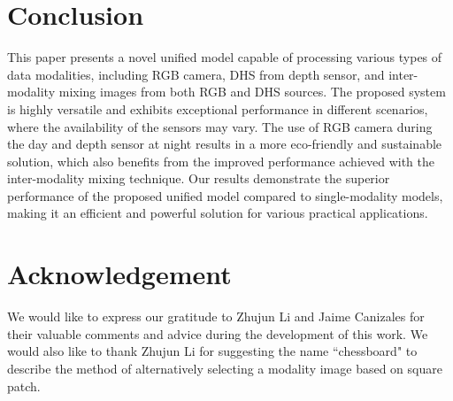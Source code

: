 \documentclass[]{modified_llncs}
\begin{document}
\section{Conclusion}
This paper presents a novel unified model capable of processing various types of data modalities, including RGB camera, DHS from depth sensor, and inter-modality mixing images from both RGB and DHS sources. The proposed system is highly versatile and exhibits exceptional performance in different scenarios, where the availability of the sensors may vary. The use of RGB camera during the day and depth sensor at night results in a more eco-friendly and sustainable solution, which also benefits from the improved performance achieved with the inter-modality mixing technique. Our results demonstrate the superior performance of the proposed unified model compared to single-modality models, making it an efficient and powerful solution for various practical applications.
\section{Acknowledgement}
We would like to express our gratitude to Zhujun Li and Jaime Canizales for their valuable comments and advice during the development of this work. We would also like to thank Zhujun Li for suggesting the name ``chessboard" to describe the method of alternatively selecting a modality image based on square patch.\\






\end{document}
